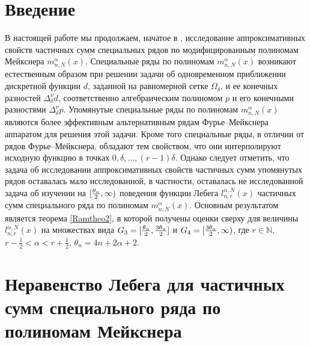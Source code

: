 \section{Введение}
В настоящей работе мы продолжаем, начатое в \cite{RamVMJ}, исследование аппроксимативных свойств
частичных сумм специальных рядов по модифицированным полиномам Мейкснера $m_{n,N}^\alpha(x)$.
Специальные ряды по полиномам $m_{n,N}^\alpha(x)$ возникают естественным образом при решении задачи об одновременном приближении дискретной функции $d$, заданной на равномерной сетке $\Omega_\delta$, и ее конечных разностей $\Delta^\nu_\delta d$, соответственно алгебраическим полиномом $p$ и его конечными разностями $\Delta^\nu_\delta p$. Упомянутые специальные ряды по полиномам $m_{n,N}^\alpha(x)$ являются более эффективным альтернативным рядам Фурье--Мейкснера аппаратом для решения этой задачи. Кроме того специальные ряды, в отличии от рядов Фурье--Мейкснера, обладают тем свойством, что они интерполируют исходную функцию в точках $0, \delta, \ldots, (r-1)\delta$.
Однако следует отметить, что задача об исследовании аппроксимативных свойств частичных сумм упомянутых рядов оставалась мало исследованной, в частности, оставалась не исследованной задача об изучении на $[{\theta_n\over 2},\infty)$  поведения функции Лебега $l_{n,r}^{\alpha,N}(x)$ частичных сумм специального ряда по полиномам $m_{n,N}^\alpha(x)$. Основным результатом является теорема \ref{Ramtheo2}, в которой получены оценки сверху для величины $l_{n,r}^{\alpha,N}(x)$ на множествах вида $G_3=[{\theta_n\over 2},{3\theta_n\over 2}]$ и $G_4=[{3\theta_n\over 2},\infty)$, где $r\in\mathbb{N}$, $r-\frac{1}{2}<\alpha<r+\frac{1}{2}$, $\theta_n=4n+2\alpha+2$.

\section{Неравенство Лебега для частичных сумм специального ряда по полиномам Мейкснера}

